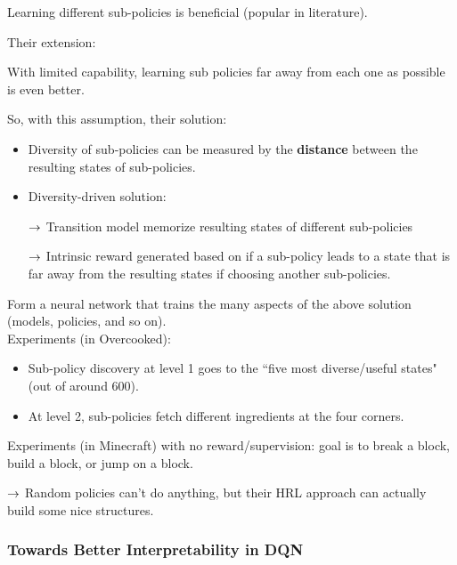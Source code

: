 \begin{assumption}
Learning different sub-policies is beneficial (popular in literature).
\end{assumption}

Their extension:
\begin{assumption}
With limited capability, learning sub policies far away from each one as possible is even better.
\end{assumption}

So, with this assumption, their solution:
\begin{itemize}
    \item Diversity of sub-policies can be measured by the {\bf distance} between the resulting states of sub-policies.
    
    \item Diversity-driven solution:
    
    $\rightarrow$ Transition model memorize resulting states of different sub-policies
    
    $\rightarrow$ Intrinsic reward generated based on if a sub-policy leads to a state that is far away from the resulting states if choosing another sub-policies.
\end{itemize}

Form a neural network that trains the many aspects of the above solution (models, policies, and so on). \\

Experiments (in Overcooked):
\begin{itemize}
    \item Sub-policy discovery at level 1 goes to the ``five most diverse/useful states" (out of around 600).
    \item At level 2, sub-policies fetch different ingredients at the four corners.
\end{itemize}

Experiments (in Minecraft) with no reward/supervision: goal is to break a block, build a block, or jump on a block.

$\rightarrow$ Random policies can't do anything, but their HRL approach can actually build some nice structures. \\




\spacerule
\subsubsection{Towards Better Interpretability in DQN~\cite{annasamy2018towards}}

